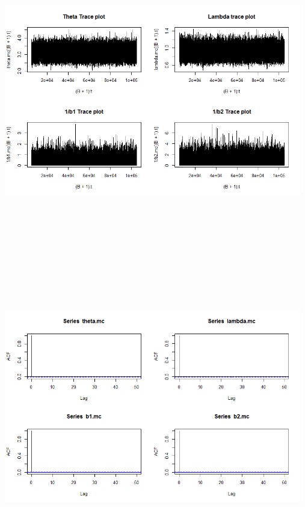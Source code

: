 \documentclass[10pt,a4paper]{article}
\begin{document}
\centerline{\includegraphics[width=13cm,height=13cm,keepaspectratio]{./images/24}}
\centerline{\includegraphics[width=13cm,height=13cm,keepaspectratio]{./images/25}}
\text{}\\
\\\
\end{document}

